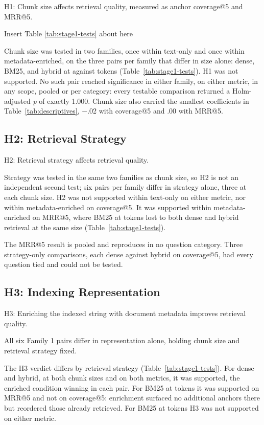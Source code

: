 H1: Chunk size affects retrieval quality, measured as anchor coverage@5 and
MRR@5.

{\centering\noindent Insert Table \ref{tab:stage1-tests} about here\par}

Chunk size was tested in two families, once within text-only and once within
metadata-enriched, on the three pairs per family that differ in size alone:
dense, BM25, and hybrid at \thesisChunkSizeSmall{} against
\thesisChunkSizeLarge{} tokens (Table~\ref{tab:stage1-tests}). H1 was not
supported. No such pair reached significance in either family, on either
metric, in any scope, pooled or per category: every testable comparison
returned a Holm-adjusted \emph{p} of exactly 1.000. Chunk size also carried the
smallest coefficients in Table~\ref{tab:descriptives}, $-$.02 with coverage@5
and .00 with MRR@5.

\subsection{H2: Retrieval Strategy}

H2: Retrieval strategy affects retrieval quality.

Strategy was tested in the same two families as chunk size, so H2 is not an
independent second test; six pairs per family differ in strategy alone, three
at each chunk size. H2 was not supported within text-only on either metric, nor
within metadata-enriched on coverage@5. It was supported within
metadata-enriched on MRR@5, where BM25 at \thesisChunkSizeLarge{} tokens lost to
both dense and hybrid retrieval at the same size (Table~\ref{tab:stage1-tests}).

The MRR@5 result is pooled and reproduces in no question category. Three
strategy-only comparisons, each dense against hybrid on coverage@5, had every
question tied and could not be tested.

\subsection{H3: Indexing Representation}

H3: Enriching the indexed string with document metadata improves retrieval
quality.

All six Family 1 pairs differ in representation alone, holding chunk size and
retrieval strategy fixed.

The H3 verdict differs by retrieval strategy (Table~\ref{tab:stage1-tests}).
For dense and hybrid, at both chunk sizes and on both metrics, it was supported, the enriched condition
winning in each pair. For BM25 at \thesisChunkSizeSmall{} tokens it was
supported on MRR@5 and not on coverage@5: enrichment surfaced no additional
anchors there but reordered those already retrieved. For BM25 at
\thesisChunkSizeLarge{} tokens H3 was not supported on either metric.

